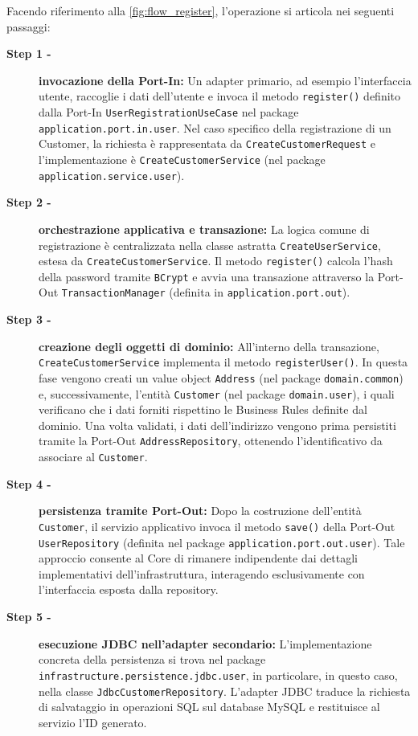 \documentclass[a4paper,11pt]{article}
\begin{document}
Facendo riferimento alla \autoref{fig:flow_register}, l'operazione si articola nei seguenti passaggi:
\begin{description}
	\item[\textbf{Step 1 -}] \textbf{invocazione della Port-In:} Un adapter primario, ad esempio l'interfaccia utente, raccoglie i dati dell'utente e invoca il metodo \texttt{register()} definito dalla Port-In \texttt{UserRegistrationUseCase} nel package \texttt{application.port.in.user}. Nel caso specifico della registrazione di un Customer, la richiesta è rappresentata da \texttt{CreateCustomerRequest} e l'implementazione è \texttt{CreateCustomerService} (nel package \texttt{application.service.user}).
	
	\item[\textbf{Step 2 -}] \textbf{orchestrazione applicativa e transazione:} La logica comune di registrazione è centralizzata nella classe astratta \texttt{CreateUserService}, estesa da \texttt{CreateCustomerService}. Il metodo \texttt{register()} calcola l'hash della password tramite \texttt{BCrypt} e avvia una transazione attraverso la Port-Out \texttt{TransactionManager} (definita in \texttt{application.port.out}).
	
	\item[\textbf{Step 3 -}] \textbf{creazione degli oggetti di dominio:} All'interno della transazione, \\ \texttt{CreateCustomerService} implementa il metodo \texttt{registerUser()}. In questa fase vengono creati un value object \texttt{Address} (nel package \texttt{domain.common}) e, successivamente, l'entità \texttt{Customer} (nel package \texttt{domain.user}), i quali verificano che i dati forniti rispettino le Business Rules definite dal dominio. Una volta validati, i dati dell'indirizzo vengono prima persistiti tramite la Port-Out \texttt{AddressRepository}, ottenendo l'identificativo da associare al \texttt{Customer}.
	
	\item[\textbf{Step 4 -}] \textbf{persistenza tramite Port-Out:} Dopo la costruzione dell'entità \texttt{Customer}, il servizio applicativo invoca il metodo \texttt{save()} della Port-Out \texttt{UserRepository} (definita nel package \texttt{application.port.out.user}). Tale approccio consente al Core di rimanere indipendente dai dettagli implementativi dell'infrastruttura, interagendo esclusivamente con l'interfaccia esposta dalla repository.
	
	\item[\textbf{Step 5 -}] \textbf{esecuzione JDBC nell'adapter secondario:} L'implementazione concreta della persistenza si trova nel package \texttt{infrastructure.persistence.jdbc.user}, in particolare, in questo caso, nella classe \texttt{JdbcCustomerRepository}. L'adapter JDBC traduce la richiesta di salvataggio in operazioni SQL sul database MySQL e restituisce al servizio l'ID generato.
\end{description}
\end{document}
